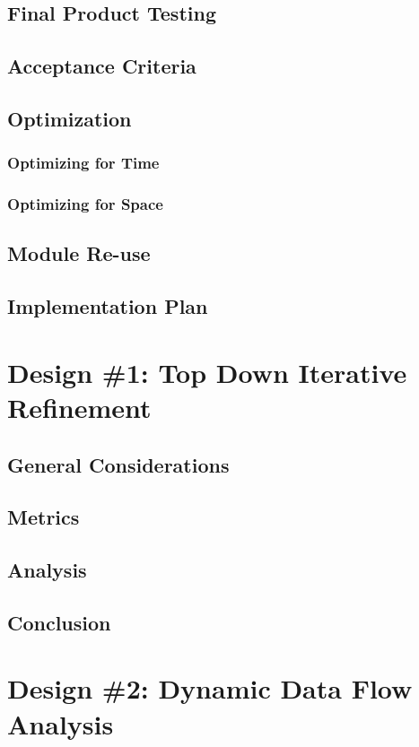 \documentclass{article}
\begin{document}
	\subsection{Final Product Testing}
	\subsection{Acceptance Criteria}
	\subsection{Optimization}
		\subsubsection{Optimizing for Time}
		\subsubsection{Optimizing for Space}
	\subsection{Module Re-use}
	\subsection{Implementation Plan}
%
%
\section{Design \#1: Top Down Iterative Refinement}
	\subsection{General Considerations}
	\subsection{Metrics}
	\subsection{Analysis}
	\subsection{Conclusion}
%
%
\section{Design \#2: Dynamic Data Flow Analysis}
\end{document}
